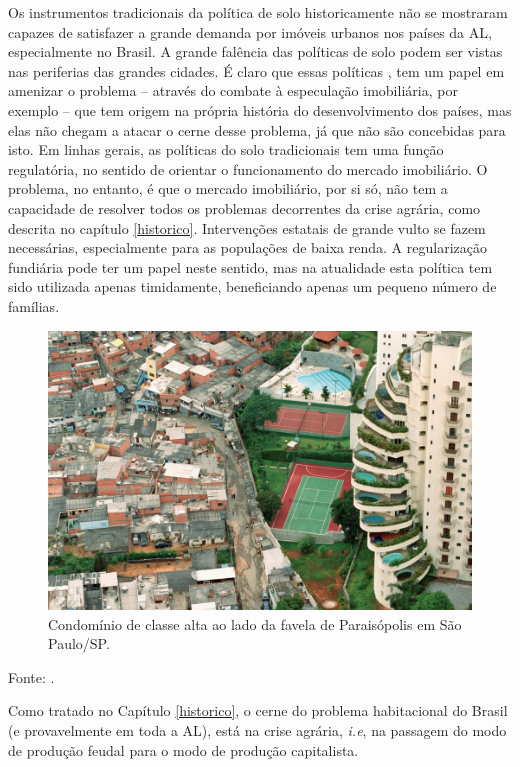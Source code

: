\documentclass[
	12pt,				%
	oneside,			%
	a4paper,			%
	chapter=TITLE,		%
	section=TITLE,		%
	english,			%
	brazil				%
	]{abntex2}
\newcommand{\bcenter}{\begin{center}}
\newcommand{\ecenter}{\end{center}}
\begin{document}
Os instrumentos tradicionais da política de solo historicamente não se mostraram
capazes de satisfazer a grande demanda por imóveis urbanos nos países da \gls{AL},
especialmente no Brasil. A grande falência das políticas de solo podem ser
vistas nas periferias das grandes cidades. É claro que essas políticas \autocite{suelo},
tem um papel em amenizar o problema -- através do combate à especulação
imobiliária, por exemplo -- que tem origem na própria história do
desenvolvimento dos países, mas elas não chegam a atacar o cerne desse problema,
já que não são concebidas para isto. Em linhas gerais, as políticas do solo
tradicionais tem uma função regulatória, no sentido de orientar o funcionamento
do mercado imobiliário. O problema, no entanto, é que o mercado imobiliário,
por si só, não tem a capacidade de resolver todos os problemas decorrentes da
crise agrária, como descrita no capítulo \ref{historico}. Intervenções estatais
de grande vulto se fazem necessárias, especialmente para as populações de baixa
renda. A regularização fundiária pode ter um papel neste sentido, mas na
atualidade esta política tem sido utilizada apenas timidamente, beneficiando
apenas um pequeno número de famílias.
\begin{figure}[H]

{\centering \includegraphics[width=0.7\linewidth]{images/injustica_SP} 

}

\caption{Condomínio de classe alta ao lado da favela de Paraisópolis em São Paulo/SP.}\label{fig:injustica}
\end{figure}
\bcenter

Fonte: \textcite{paraisopolis}.
\ecenter

Como tratado no Capítulo \ref{historico}, o cerne do problema habitacional
do Brasil (e provavelmente em toda a \gls{AL}), está na crise agrária,
\emph{i.e}, na passagem do modo de produção feudal para o modo de produção
capitalista.
\end{document}
